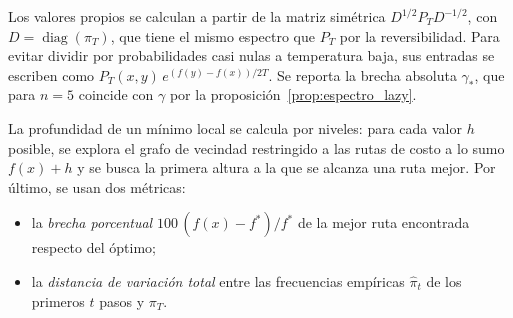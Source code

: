 Los valores propios se calculan a partir de la matriz simétrica
\(D^{1/2}P_TD^{-1/2}\), con \(D=\operatorname{diag}(\pi_T)\), que tiene
el mismo espectro que \(P_T\) por la reversibilidad. Para evitar
dividir por probabilidades casi nulas a temperatura baja, sus entradas
se escriben como \(P_T(x,y)\,e^{(f(y)-f(x))/2T}\). Se reporta la brecha
absoluta \(\gamma_\ast\), que para \(n=5\) coincide con \(\gamma\) por
la proposición~\ref{prop:espectro_lazy}.

La profundidad de un mínimo local se calcula por niveles: para cada
valor \(h\) posible, se explora el grafo de vecindad restringido a las
rutas de costo a lo sumo \(f(x)+h\) y se busca la primera altura a la
que se alcanza una ruta mejor. Por último, se usan dos métricas:
\begin{itemize}
    \item la \emph{brecha porcentual} \(100\,(f(x)-f^\ast)/f^\ast\) de
    la mejor ruta encontrada respecto del óptimo;
    \item la \emph{distancia de variación total} entre las frecuencias
    empíricas \(\hat\pi_t\) de los primeros \(t\) pasos y \(\pi_T\).
\end{itemize}
